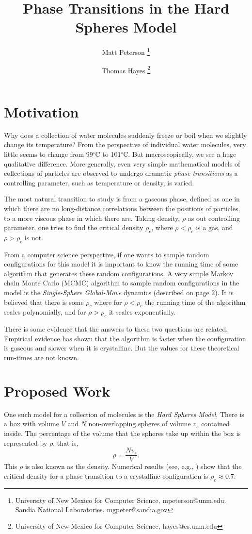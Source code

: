 \documentclass[a4paper,11pt]{article}
\title{Phase Transitions in the Hard Spheres Model}
\author{Matt Peterson \thanks{University of New Mexico for Computer Science, mpeterson@unm.edu. Sandia National Laboratories, mgpeter@sandia.gov} \and Thomas Hayes \thanks{University of New Mexico for Computer Science, hayes@cs.unm.edu}}
\begin{document}
\maketitle

\section*{Motivation}

Why does a collection of water molecules suddenly freeze or boil when we slightly change its temperature?  From the perspective of individual water molecules, very little seems to change from 99$^\circ$C to 101$^\circ$C.  But macroscopically, we see a huge qualitative difference.  More generally, even very simple mathematical models of collections of particles are observed to undergo dramatic \textit{phase transitions} as a controlling parameter, such as temperature or density, is varied.

The most natural transition to study is from a gaseous phase, defined as one in which there are no long-distance correlations between the positions of particles, to a more viscous phase in which there are.  Taking density, $\rho$ as out controlling parameter, one tries to find the critical density $\rho_c$, where $\rho < \rho_c$ is a gas, and $\rho > \rho_c$ is not.

From a computer science perspective, if one wants to sample random configurations for this model it is important to know the running time of some algorithm that generates these random configurations.  A very simple Markov chain Monte Carlo (MCMC) algorithm to sample random configurations in the model is the \textit{Single-Sphere Global-Move} dynamics (described on page 2).  It is believed that there is some $\rho_c$ where for $\rho < \rho_c$ the running time of the algorithm scales polynomially, and for $\rho > \rho_c$ it scales exponentially.

There is some evidence that the answers to these two questions are related.  Empirical evidence has shown that the algorithm is faster when the configuration is gaseous and slower when it is crystalline.  But the values for these theoretical run-times are not known.

\section*{Proposed Work}

One such model for a collection of molecules is the \textit{Hard Spheres Model}.  There is a box with volume $V$ and $N$ non-overlapping spheres of volume $v_s$ contained inside.  The percentage of the volume that the spheres take up within the box is represented by $\rho$, that is,
\begin{displaymath}
  \rho = \frac{Nv_s}{V}.
\end{displaymath}
This $\rho$ is also known as the density. Numerical results (see, e.g., \cite{Mak}\cite{Piasecki}) show that the critical density for a phase transition to a crystalline configuration is $\rho_c \approx 0.7$.
\end{document}
